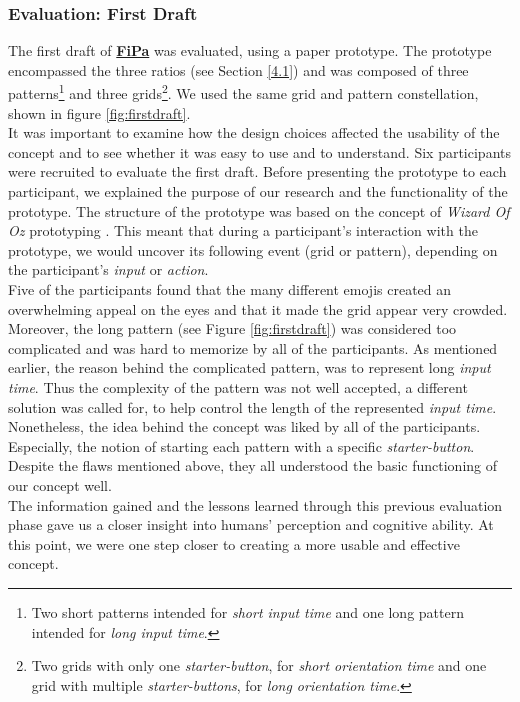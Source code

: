 \subsubsection{Evaluation: First Draft} \label{4.2.2.2}

The first draft of \underline{\textbf{FiPa}} was evaluated, using a paper prototype. The prototype encompassed the three ratios (see Section \ref{4.1}) and was composed of three patterns\footnote{Two short patterns intended for \textit{short input time} and one long pattern intended for \textit{long input time}.} and three grids\footnote{Two grids with only one \textit{starter-button}, for \textit{short orientation time} and one grid with multiple \textit{starter-buttons}, for \textit{long orientation time}.}. We used the same grid and pattern constellation, shown in figure \ref{fig:firstdraft}.\\
It was important to examine how the design choices affected the usability of the concept and to see whether it was easy to use and to understand. Six participants were recruited to evaluate the first draft. Before presenting the prototype to each participant, we explained the purpose of our research and the functionality of the prototype. The structure of the prototype was based on the concept of \textit{Wizard Of Oz} prototyping \cite{Butz2014}. This meant that during a participant's interaction with the prototype, we would uncover its following event (grid or pattern), depending on the participant's \textit{input} or \textit{action}.\\

Five of the participants found that the many different emojis created an overwhelming appeal on the eyes and that it made the grid appear very crowded. Moreover, the long pattern (see Figure \ref{fig:firstdraft}) was considered too complicated and was hard to memorize by all of the participants. As mentioned earlier, the reason behind the complicated pattern, was to represent long \textit{input time}. Thus the complexity of the pattern was not well accepted, a different solution was called for, to help control the length of the represented \textit{input time}. Nonetheless, the idea behind the concept was liked by all of the participants. Especially, the notion of starting each pattern with a specific \textit{starter-button}. Despite the flaws mentioned above, they all understood the basic functioning of our concept well. \\

The information gained and the lessons learned through this previous evaluation phase gave us a closer insight into humans' perception and cognitive ability. At this point, we were one step closer to creating a more usable and effective concept.

